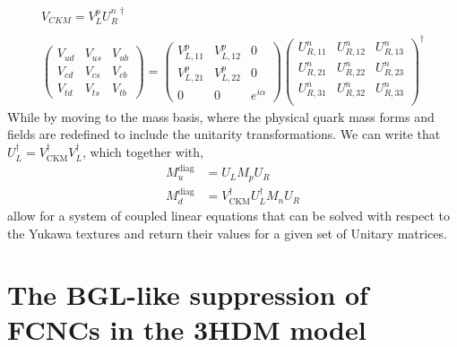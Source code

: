 \begin{equation}
\begin{gathered}
V_{CKM} = V_L^p U_R^{n\, \dagger}  \\ 
\\
\begin{pmatrix}
V_{ud} & V_{us} & V_{ub} \\
V_{cd} & V_{cs} & V_{cb} \\ 
V_{td} & V_{ts} & V_{tb} 
\end{pmatrix}  = \begin{pmatrix}
V_{L,11}^p & V_{L,12}^p & 0 \\ 
V_{L,21}^p & V_{L,22}^p & 0 \\ 
0 & 0 & e^{i \alpha} 
\end{pmatrix} \begin{pmatrix}
U_{R,11}^n & U_{R,12}^n & U_{R,13}^n \\
U_{R,21}^n & U_{R,22}^n & U_{R,23}^n \\
U_{R,31}^n & U_{R,32}^n & U_{R,33}^n \\
\end{pmatrix} ^\dagger 
\end{gathered} 
\end{equation}
%
While by moving to the mass basis, 
%
where the physical quark mass forms and fields are redefined to include the unitarity transformations. We can write that $U_L^\dagger = V^\dagger_{\text{CKM}} V_L^\dagger$, which together with,
\begin{equation}
\begin{split}
M_u^{\text{diag}} & = U_L M_p U_R \\  
M_d^{\text{diag}} & = V^\dagger_{\text{CKM}} U_L^\dagger M_n U_R  
\end{split}  
\end{equation} 
allow for a system of coupled linear equations that can be solved with respect to the Yukawa textures and return their values for a given set of Unitary matrices. 

\section{The BGL-like suppression of FCNCs in the 3HDM model}

